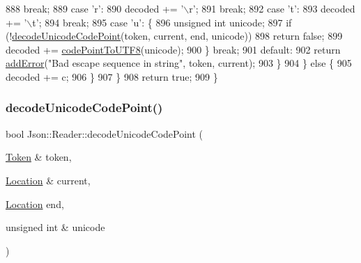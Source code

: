 \begin{DoxyCode}
888         \textcolor{keywordflow}{break};
889       \textcolor{keywordflow}{case} \textcolor{charliteral}{'r'}:
890         decoded += \textcolor{charliteral}{'\(\backslash\)r'};
891         \textcolor{keywordflow}{break};
892       \textcolor{keywordflow}{case} \textcolor{charliteral}{'t'}:
893         decoded += \textcolor{charliteral}{'\(\backslash\)t'};
894         \textcolor{keywordflow}{break};
895       \textcolor{keywordflow}{case} \textcolor{charliteral}{'u'}: \{
896         \textcolor{keywordtype}{unsigned} \textcolor{keywordtype}{int} unicode;
897         \textcolor{keywordflow}{if} (!\hyperlink{class_json_1_1_reader_a8fe24db3e9953aef3d637a56447e795c}{decodeUnicodeCodePoint}(token, current, end, unicode))
898           \textcolor{keywordflow}{return} \textcolor{keyword}{false};
899         decoded += \hyperlink{namespace_json_a33f8bda65a5b1fc4f5ddc39cb03dc742}{codePointToUTF8}(unicode);
900       \} \textcolor{keywordflow}{break};
901       \textcolor{keywordflow}{default}:
902         \textcolor{keywordflow}{return} \hyperlink{class_json_1_1_reader_af02176a1d2786b4415bbb00a1b10bb6b}{addError}(\textcolor{stringliteral}{"Bad escape sequence in string"}, token, current);
903       \}
904     \} \textcolor{keywordflow}{else} \{
905       decoded += c;
906     \}
907   \}
908   \textcolor{keywordflow}{return} \textcolor{keyword}{true};
909 \}
\end{DoxyCode}
\mbox{\label{class_json_1_1_reader_a8fe24db3e9953aef3d637a56447e795c}} 
\subsubsection{\texorpdfstring{decode\+Unicode\+Code\+Point()}{decodeUnicodeCodePoint()}}
{\footnotesize\ttfamily bool Json\+::\+Reader\+::decode\+Unicode\+Code\+Point (\begin{DoxyParamCaption}\item[{\hyperlink{class_json_1_1_reader_1_1_token}{Token} \&}]{token,  }\item[{\hyperlink{class_json_1_1_reader_a46795b5b272bf79a7730e406cb96375a}{Location} \&}]{current,  }\item[{\hyperlink{class_json_1_1_reader_a46795b5b272bf79a7730e406cb96375a}{Location}}]{end,  }\item[{unsigned int \&}]{unicode }\end{DoxyParamCaption})\hspace{0.3cm}{\ttfamily [private]}}



